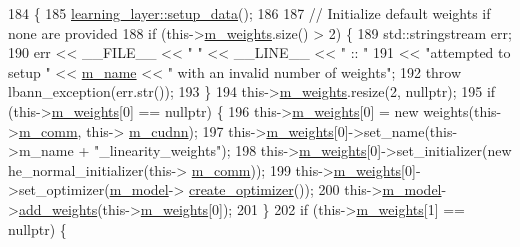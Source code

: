 \begin{DoxyCode}
184                              \{
185     \hyperlink{classlbann_1_1Layer_a50a89f8a68762c677d48efe384676e81}{learning\_layer::setup\_data}();
186 
187     \textcolor{comment}{// Initialize default weights if none are provided}
188     \textcolor{keywordflow}{if} (this->\hyperlink{classlbann_1_1Layer_a7954e30fbf9100a6ba4b56d02767a469}{m\_weights}.size() > 2) \{
189       std::stringstream err;
190       err << \_\_FILE\_\_ << \textcolor{stringliteral}{" "} << \_\_LINE\_\_ << \textcolor{stringliteral}{" :: "}
191           << \textcolor{stringliteral}{"attempted to setup "} << \hyperlink{classlbann_1_1Layer_aa47109ad09b399142fa92f9d3702189f}{m\_name} << \textcolor{stringliteral}{" with an invalid number of weights"};
192       \textcolor{keywordflow}{throw} lbann\_exception(err.str());
193     \}
194     this->\hyperlink{classlbann_1_1Layer_a7954e30fbf9100a6ba4b56d02767a469}{m\_weights}.resize(2, \textcolor{keyword}{nullptr});
195     \textcolor{keywordflow}{if} (this->\hyperlink{classlbann_1_1Layer_a7954e30fbf9100a6ba4b56d02767a469}{m\_weights}[0] == \textcolor{keyword}{nullptr}) \{
196       this->\hyperlink{classlbann_1_1Layer_a7954e30fbf9100a6ba4b56d02767a469}{m\_weights}[0] = \textcolor{keyword}{new} weights(this->\hyperlink{classlbann_1_1Layer_a5de05c52f22e0bbd7c703bec3ad4dbf2}{m\_comm}, this->
      \hyperlink{classlbann_1_1Layer_a08dbb94239e3b8c96329786c57c72e21}{m\_cudnn});
197       this->\hyperlink{classlbann_1_1Layer_a7954e30fbf9100a6ba4b56d02767a469}{m\_weights}[0]->set\_name(this->m\_name + \textcolor{stringliteral}{"\_linearity\_weights"});
198       this->\hyperlink{classlbann_1_1Layer_a7954e30fbf9100a6ba4b56d02767a469}{m\_weights}[0]->set\_initializer(\textcolor{keyword}{new} he\_normal\_initializer(this->
      \hyperlink{classlbann_1_1Layer_a5de05c52f22e0bbd7c703bec3ad4dbf2}{m\_comm}));
199       this->\hyperlink{classlbann_1_1Layer_a7954e30fbf9100a6ba4b56d02767a469}{m\_weights}[0]->set\_optimizer(\hyperlink{classlbann_1_1Layer_a3d9315e99574166f2f33e37b572021d2}{m\_model}->
      \hyperlink{classlbann_1_1model_a0d2d5a1eac592e5721a81a9b9ea4b7f2}{create\_optimizer}());
200       this->\hyperlink{classlbann_1_1Layer_a3d9315e99574166f2f33e37b572021d2}{m\_model}->\hyperlink{classlbann_1_1model_af35fca77e75eb6dd570e4727aa3d5b6b}{add\_weights}(this->\hyperlink{classlbann_1_1Layer_a7954e30fbf9100a6ba4b56d02767a469}{m\_weights}[0]);
201     \}
202     \textcolor{keywordflow}{if} (this->\hyperlink{classlbann_1_1Layer_a7954e30fbf9100a6ba4b56d02767a469}{m\_weights}[1] == \textcolor{keyword}{nullptr}) \{

\end{DoxyCode}
